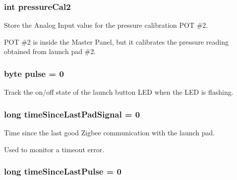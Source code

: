 \subsubsection[{\texorpdfstring{pressure\+Cal2}{pressureCal2}}]{\setlength{\rightskip}{0pt plus 5cm}int pressure\+Cal2}\hypertarget{masterPanel_8ino_a686c48254491c41288fdf685b232594d}{}\label{masterPanel_8ino_a686c48254491c41288fdf685b232594d}


Store the Analog Input value for the pressure calibration P\+OT \#2. 

P\+OT \#2 is inside the Master Panel, but it calibrates the pressure reading obtained from launch pad \#2. 
\subsubsection[{\texorpdfstring{pulse}{pulse}}]{\setlength{\rightskip}{0pt plus 5cm}byte pulse = 0}\hypertarget{masterPanel_8ino_a3122ae67163a917df3ce95816c7c44e7}{}\label{masterPanel_8ino_a3122ae67163a917df3ce95816c7c44e7}


Track the on/off state of the launch button L\+ED when the L\+ED is flashing. 

\subsubsection[{\texorpdfstring{time\+Since\+Last\+Pad\+Signal}{timeSinceLastPadSignal}}]{\setlength{\rightskip}{0pt plus 5cm}long time\+Since\+Last\+Pad\+Signal = 0}\hypertarget{masterPanel_8ino_af44f6a2e4c00006fb058d00348168159}{}\label{masterPanel_8ino_af44f6a2e4c00006fb058d00348168159}


Time since the last good Zigbee communication with the launch pad. 

Used to monitor a timeout error. 
\subsubsection[{\texorpdfstring{time\+Since\+Last\+Pulse}{timeSinceLastPulse}}]{\setlength{\rightskip}{0pt plus 5cm}long time\+Since\+Last\+Pulse = 0}\hypertarget{masterPanel_8ino_af8d9d76d18b6aee4b209d4f3b9f2d8d3}{}\label{masterPanel_8ino_af8d9d76d18b6aee4b209d4f3b9f2d8d3}


